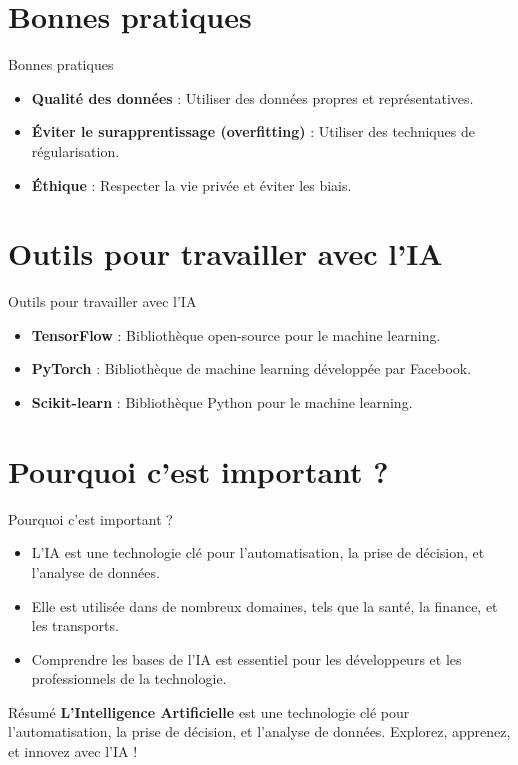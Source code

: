 \documentclass{clbeamer2024}
\begin{document}
	
	\section{Bonnes pratiques}
	\begin{frame}{Bonnes pratiques}
		\begin{itemize}
			\item \textbf{Qualité des données} : Utiliser des données propres et représentatives.
			\item \textbf{Éviter le surapprentissage (overfitting)} : Utiliser des techniques de régularisation.
			\item \textbf{Éthique} : Respecter la vie privée et éviter les biais.
		\end{itemize}
	\end{frame}
	
	\section{Outils pour travailler avec l'IA}
	\begin{frame}{Outils pour travailler avec l'IA}
		\begin{itemize}
			\item \textbf{TensorFlow} : Bibliothèque open-source pour le machine learning.
			\item \textbf{PyTorch} : Bibliothèque de machine learning développée par Facebook.
			\item \textbf{Scikit-learn} : Bibliothèque Python pour le machine learning.
		\end{itemize}
	\end{frame}
	
	
	
	
	
	
	\section{Pourquoi c'est important ?}
	\begin{frame}{Pourquoi c'est important ?}
		\begin{itemize}
			\item L'IA est une technologie clé pour l'automatisation, la prise de décision, et l'analyse de données.
			\item Elle est utilisée dans de nombreux domaines, tels que la santé, la finance, et les transports.
			\item Comprendre les bases de l'IA est essentiel pour les développeurs et les professionnels de la technologie.
		\end{itemize}
	\end{frame}
	
	\begin{frame}{Résumé}
		\textbf{L'Intelligence Artificielle} est une technologie clé pour l'automatisation, la prise de décision, et l'analyse de données.  
		Explorez, apprenez, et innovez avec l'IA !
	\end{frame}
	
	

	
	
\end{document}
